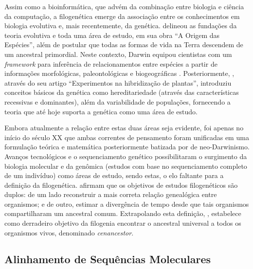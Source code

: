 \documentclass[english,brazilian]{UNISINOSmonografia} %
\begin{document}
Assim como a bioinformática, que advém da combinação entre biologia e ciência da computação, a filogenética emerge da associação entre os conhecimentos em biologia evolutiva e, mais recentemente, da genética.
 delineou as fundações da teoria evolutiva e toda uma área de estudo, em sua obra ``A Origem das Espécies'', além de postular que todas as formas de vida na Terra descendem de um ancestral primordial.
Neste contexto, Darwin equipou cientistas com um \textit{framework} para inferência de relacionamentos entre espécies a partir de informações morfológicas, paleontológicas e biogeográficas \cite{Keane2006a}.
Posteriormente, , através do seu artigo ``Experimentos na hibridização de plantas'', introduziu conceitos básicos da genética como hereditariedade (através das características recessivas e dominantes), além da variabilidade de populações, fornecendo a teoria que até hoje suporta a genética como uma área de estudo.






Embora atualmente a relação entre estas duas áreas seja evidente, foi apenas no início do século XX que ambas correntes de pensamento foram unificadas em uma formulação teórica e matemática posteriormente batizada por  de neo-Darwinismo.
Avanços tecnológicos e o sequenciamento genético possibilitaram o surgimento da biologia molecular e da genômica (estudos com base no sequenciamento completo de um indivíduo) como áreas de estudo, sendo estas, o elo faltante para a definição da filogenética.
 afirmam que os objetivos de estudos filogenéticos são duplos: de um lado reconstruir a mais correta relação genealógica entre organismos; e de outro, estimar a divergência de tempo desde que tais organismos compartilharam um ancestral comum.
Extrapolando esta definição, , estabelece como derradeiro objetivo da filogenia encontrar o ancestral universal a todos os organismos vivos, denominado \textit{cenancestor}.




\subsection{Alinhamento de Sequências Moleculares}
\end{document}
